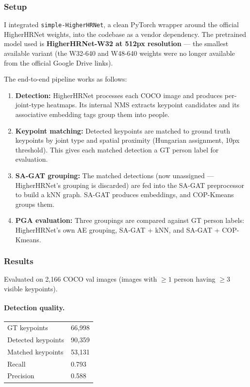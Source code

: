 \subsubsection{Setup}

I integrated \texttt{simple-HigherHRNet}, a clean PyTorch wrapper around the official HigherHRNet weights, into the codebase as a vendor dependency. The pretrained model used is \textbf{HigherHRNet-W32 at 512px resolution} --- the smallest available variant (the W32-640 and W48-640 weights were no longer available from the official Google Drive links).

The end-to-end pipeline works as follows:
\begin{enumerate}
    \item \textbf{Detection:} HigherHRNet processes each COCO image and produces per-joint-type heatmaps. Its internal NMS extracts keypoint candidates and its associative embedding tags group them into people.
    \item \textbf{Keypoint matching:} Detected keypoints are matched to ground truth keypoints by joint type and spatial proximity (Hungarian assignment, 10px threshold). This gives each matched detection a GT person label for evaluation.
    \item \textbf{SA-GAT grouping:} The matched detections (now unassigned --- HigherHRNet's grouping is discarded) are fed into the SA-GAT preprocessor to build a kNN graph. SA-GAT produces embeddings, and COP-Kmeans groups them.
    \item \textbf{PGA evaluation:} Three groupings are compared against GT person labels: HigherHRNet's own AE grouping, SA-GAT + kNN, and SA-GAT + COP-Kmeans.
\end{enumerate}

\subsubsection{Results}

Evaluated on 2,166 COCO val images (images with $\geq 1$ person having $\geq 3$ visible keypoints).

\paragraph{Detection quality.}

\begin{tabular}{ll}
\hline
GT keypoints & 66,998 \\
Detected keypoints & 90,359 \\
Matched keypoints & 53,131 \\
Recall & 0.793 \\
Precision & 0.588 \\
\hline
\end{tabular}

